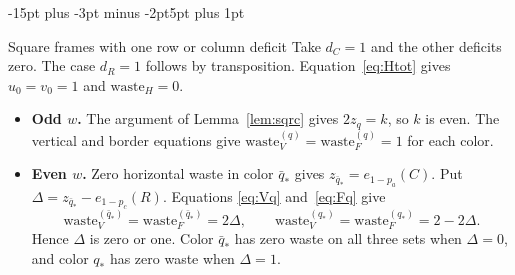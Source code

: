 \documentclass[11pt,a4paper]{article}
\makeatletter
\renewcommand{\subsection}{\@startsection{subsection}{2}{\z@}%
  {-15pt plus -3pt minus -2pt}{5pt plus 1pt}%
  {\normalfont\bfseries\raggedright}}
\theoremstyle{result}
\theoremstyle{definition}
\theoremstyle{remark}
\newcommand{\waste}{\mathrm{waste}}
\makeatother
\begin{document}
\subsection{Square frames with one row or column deficit}
Take $d_C=1$ and the other deficits zero. The case $d_R=1$
follows by transposition. Equation~\eqref{eq:Htot} gives
$u_0=v_0=1$ and $\waste_H=0$.
\begin{itemize}[leftmargin=1.8em,itemsep=3pt]
  \item \textbf{Odd $w$.} The argument of Lemma~\ref{lem:sqrc} gives
    $2z_q=k$, so $k$ is even. The vertical and border equations
    give $\waste_V^{(q)}=\waste_F^{(q)}=1$ for each color.
  \item \textbf{Even $w$.} Zero horizontal waste in color $\bar q_*$
    gives $z_{\bar q_*}=e_{1-p_a}(C)$. Put
    $\Delta=z_{\bar q_*}-e_{1-p_c}(R)$. Equations
    \eqref{eq:Vq} and~\eqref{eq:Fq} give
    \[
      \waste_V^{(\bar q_*)}=\waste_F^{(\bar q_*)}=2\Delta,\qquad
      \waste_V^{(q_*)}=\waste_F^{(q_*)}=2-2\Delta.
    \]
    Hence $\Delta$ is zero or one. Color $\bar q_*$ has zero
    waste on all three sets when $\Delta=0$, and color $q_*$
    has zero waste when $\Delta=1$.
\end{itemize}
\end{document}
